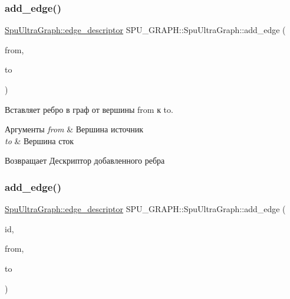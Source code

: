 \subsubsection{\texorpdfstring{add\+\_\+edge()}{add\_edge()}\hspace{0.1cm}{\footnotesize\ttfamily [5/7]}}
{\footnotesize\ttfamily \hyperlink{class_s_p_u___g_r_a_p_h_1_1_spu_ultra_graph_a5f3776e003ef0a1648f1d9f84289810b}{Spu\+Ultra\+Graph\+::edge\+\_\+descriptor} S\+P\+U\+\_\+\+G\+R\+A\+P\+H\+::\+Spu\+Ultra\+Graph\+::add\+\_\+edge (\begin{DoxyParamCaption}\item[{Spu\+Ultra\+Graph\+::vertex\+\_\+descriptor}]{from,  }\item[{Spu\+Ultra\+Graph\+::vertex\+\_\+descriptor}]{to }\end{DoxyParamCaption})}

Вставляет ребро в граф от вершины from к to. 
\begin{DoxyParams}{Аргументы}
{\em from} & Вершина источник \\
\hline
{\em to} & Вершина сток \\
\hline
\end{DoxyParams}
\begin{DoxyReturn}{Возвращает}
Дескриптор добавленного ребра 
\end{DoxyReturn}
\mbox{\label{class_s_p_u___g_r_a_p_h_1_1_spu_ultra_graph_a498c64e2dafbb4b294367ec325536b4f}} 
\subsubsection{\texorpdfstring{add\+\_\+edge()}{add\_edge()}\hspace{0.1cm}{\footnotesize\ttfamily [6/7]}}
{\footnotesize\ttfamily \hyperlink{class_s_p_u___g_r_a_p_h_1_1_spu_ultra_graph_a5f3776e003ef0a1648f1d9f84289810b}{Spu\+Ultra\+Graph\+::edge\+\_\+descriptor} S\+P\+U\+\_\+\+G\+R\+A\+P\+H\+::\+Spu\+Ultra\+Graph\+::add\+\_\+edge (\begin{DoxyParamCaption}\item[{\hyperlink{class_s_p_u___g_r_a_p_h_1_1_spu_ultra_graph_a5f3776e003ef0a1648f1d9f84289810b}{Spu\+Ultra\+Graph\+::edge\+\_\+descriptor}}]{id,  }\item[{Spu\+Ultra\+Graph\+::vertex\+\_\+descriptor}]{from,  }\item[{Spu\+Ultra\+Graph\+::vertex\+\_\+descriptor}]{to }\end{DoxyParamCaption})}

